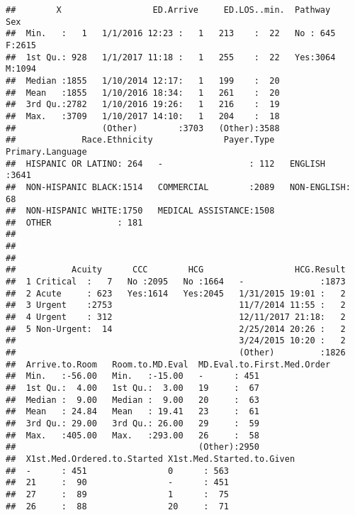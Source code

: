 \documentclass[]{article}
\begin{document}
\begin{verbatim}
##        X                  ED.Arrive     ED.LOS..min.  Pathway    Sex     
##  Min.   :   1   1/1/2016 12:23 :   1   213    :  22   No : 645   F:2615  
##  1st Qu.: 928   1/1/2017 11:18 :   1   255    :  22   Yes:3064   M:1094  
##  Median :1855   1/10/2014 12:17:   1   199    :  20                      
##  Mean   :1855   1/10/2016 18:34:   1   261    :  20                      
##  3rd Qu.:2782   1/10/2016 19:26:   1   216    :  19                      
##  Max.   :3709   1/10/2017 14:10:   1   204    :  18                      
##                 (Other)        :3703   (Other):3588                      
##             Race.Ethnicity              Payer.Type      Primary.Language
##  HISPANIC OR LATINO: 264   -                 : 112   ENGLISH    :3641   
##  NON-HISPANIC BLACK:1514   COMMERCIAL        :2089   NON-ENGLISH:  68   
##  NON-HISPANIC WHITE:1750   MEDICAL ASSISTANCE:1508                      
##  OTHER             : 181                                                
##                                                                         
##                                                                         
##                                                                         
##           Acuity      CCC        HCG                  HCG.Result  
##  1 Critical  :   7   No :2095   No :1664   -               :1873  
##  2 Acute     : 623   Yes:1614   Yes:2045   1/31/2015 19:01 :   2  
##  3 Urgent    :2753                         11/7/2014 11:55 :   2  
##  4 Urgent    : 312                         12/11/2017 21:18:   2  
##  5 Non-Urgent:  14                         2/25/2014 20:26 :   2  
##                                            3/24/2015 10:20 :   2  
##                                            (Other)         :1826  
##  Arrive.to.Room   Room.to.MD.Eval  MD.Eval.to.First.Med.Order
##  Min.   :-56.00   Min.   :-15.00   -      : 451              
##  1st Qu.:  4.00   1st Qu.:  3.00   19     :  67              
##  Median :  9.00   Median :  9.00   20     :  63              
##  Mean   : 24.84   Mean   : 19.41   23     :  61              
##  3rd Qu.: 29.00   3rd Qu.: 26.00   29     :  59              
##  Max.   :405.00   Max.   :293.00   26     :  58              
##                                    (Other):2950              
##  X1st.Med.Ordered.to.Started X1st.Med.Started.to.Given
##  -      : 451                0      : 563             
##  21     :  90                -      : 451             
##  27     :  89                1      :  75             
##  26     :  88                20     :  71             

\end{verbatim}
\end{document}
